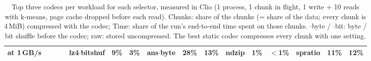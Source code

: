 \begin{table}[t]
\begin{tabular}{l lrr lrr lrr lrr lrr}
\scriptsize at 1\,GB/s &  &  &  & lz4$\cdot$bitshuf & 9\% & 3\% & ans$\cdot$byte & 28\% & 13\% & ndzip & 1\% & $<$1\% & spratio & 11\% & 12\% \\
\bottomrule
\end{tabular}
\caption{Top three codecs per workload for each selector, measured in Clio (1 process, 1 chunk in flight, 1 write + 10 reads with k-means, page cache dropped before each read). Chunks: share of the chunks (= share of the data; every chunk is 4\,MiB) compressed with the codec; Time: share of the run's end-to-end time spent on those chunks. $\cdot$byte / $\cdot$bit: byte / bit shuffle before the codec; raw: stored uncompressed. The best static codec compresses every chunk with one setting.}
\label{tab:top-codecs}
\end{table}
